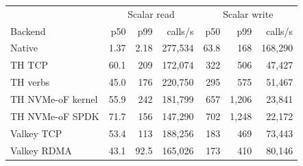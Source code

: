 \small
\begin{tabular}{lrrr|rrr}\toprule
& \multicolumn{3}{c|}{Scalar read} & \multicolumn{3}{c}{Scalar write}\\
Backend & p50 & p99 & calls/s & p50 & p99 & calls/s\\\midrule
Native & 1.37 & 2.18 & 277{,}534 & 63.8 & 168 & 168{,}290\\
TH TCP & 60.1 & 209 & 172{,}074 & 322 & 506 & 47{,}427\\
TH verbs & 45.0 & 176 & 220{,}750 & 295 & 575 & 51{,}467\\
TH NVMe-oF kernel & 55.9 & 242 & 181{,}799 & 657 & 1{,}206 & 23{,}841\\
TH NVMe-oF SPDK & 71.7 & 156 & 147{,}290 & 702 & 1{,}248 & 22{,}172\\
Valkey TCP & 53.4 & 113 & 188{,}256 & 183 & 469 & 73{,}443\\
Valkey RDMA & 43.1 & 92.5 & 165{,}026 & 173 & 410 & 80{,}146\\
\bottomrule\end{tabular}
